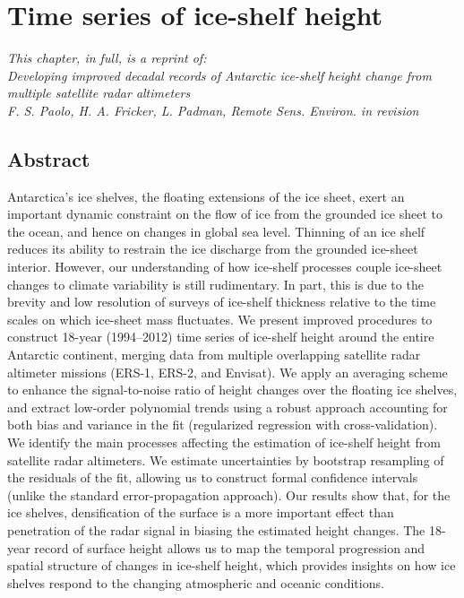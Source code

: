 %
%

\chapter{Time series of ice-shelf height}

{\sl
\noindent
This chapter, in full, is a reprint of:\\
Developing improved decadal records of Antarctic ice-shelf height change from multiple satellite radar altimeters\\
F. S. Paolo, H. A. Fricker, L. Padman, {\rm Remote Sens. Environ.} in revision 
}


\section{Abstract}

\noindent
Antarctica's ice shelves, the floating extensions of the ice sheet, exert an important dynamic constraint on the flow of ice from the grounded ice sheet to the ocean, and hence on changes in global sea level. Thinning of an ice shelf reduces its ability to restrain the ice discharge from the grounded ice-sheet interior. However, our understanding of how ice-shelf processes couple ice-sheet changes to climate variability is still rudimentary. In part, this is due to the brevity and low resolution of surveys of ice-shelf thickness relative to the time scales on which ice-sheet mass fluctuates. We present improved procedures to construct 18-year (1994--2012) time series of ice-shelf height around the entire Antarctic continent, merging data from multiple overlapping satellite radar altimeter missions (ERS-1, ERS-2, and Envisat). We apply an averaging scheme to enhance the signal-to-noise ratio of height changes over the floating ice shelves, and extract low-order polynomial trends using a robust approach accounting for both bias and variance in the fit (regularized regression with cross-validation). We identify the main processes affecting the estimation of ice-shelf height from satellite radar altimeters. We estimate uncertainties by bootstrap resampling of the residuals of the fit, allowing us to construct formal confidence intervals (unlike the standard error-propagation approach). Our results show that, for the ice shelves, densification of the surface is a more important effect than penetration of the radar signal in biasing the estimated height changes. The 18-year record of surface height allows us to map the temporal progression and spatial structure of changes in ice-shelf height, which provides insights on how ice shelves respond to the changing atmospheric and oceanic conditions.

